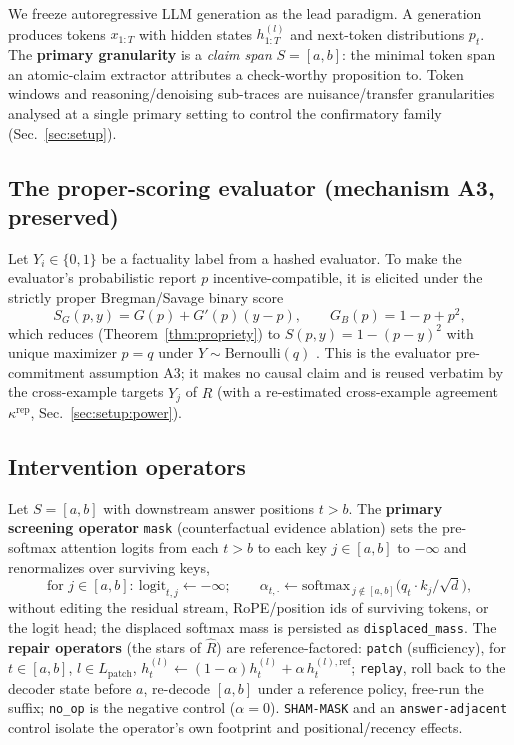 \documentclass[11pt]{article}
\theoremstyle{plain}
\theoremstyle{definition}
\newcommand{\Rhat}{\widehat{R}}
\begin{document}
We freeze autoregressive LLM generation as the lead paradigm. A generation produces
tokens $x_{1:T}$ with hidden states $h^{(l)}_{1:T}$ and next-token distributions
$p_t$. The \textbf{primary granularity} is a \emph{claim span} $S=[a,b]$: the
minimal token span an atomic-claim extractor attributes a check-worthy proposition
to. Token windows and reasoning/denoising sub-traces are nuisance/transfer
granularities analysed at a single primary setting to control the confirmatory
family (Sec.~\ref{sec:setup}).

\subsection{The proper-scoring evaluator (mechanism A3, preserved)}\label{sec:ciu:proper}

Let $Y_i\in\{0,1\}$ be a factuality label from a hashed evaluator. To make the
evaluator's probabilistic report $p$ incentive-compatible, it is elicited under the
strictly proper Bregman/Savage binary score
\begin{equation}
S_G(p,y) = G(p) + G'(p)(y-p),
\qquad G_B(p)=1-p+p^2,
\label{eq:savage}
\end{equation}
which reduces (Theorem~\ref{thm:propriety}) to $S(p,y)=1-(p-y)^2$ with unique
maximizer $p=q$ under $Y\sim\mathrm{Bernoulli}(q)$
\cite{savage1971elicitation,gneiting2007strictly,brier1950verification}. This is
the evaluator pre-commitment assumption A3; it makes no causal claim and is reused
verbatim by the cross-example targets $Y_j$ of $\Rhat$ (with a re-estimated
cross-example agreement $\kappa^{\mathrm{rep}}$, Sec.~\ref{sec:setup:power}).

\subsection{Intervention operators}\label{sec:ciu:ops}

Let $S=[a,b]$ with downstream answer positions $t>b$. The \textbf{primary screening
operator} \texttt{mask} (counterfactual evidence ablation) sets the pre-softmax
attention logits from each $t>b$ to each key $j\in[a,b]$ to $-\infty$ and
renormalizes over surviving keys,
\begin{equation}
\text{for } j\in[a,b]:\ \mathrm{logit}_{t,j}\leftarrow-\infty;
\qquad \alpha_{t,\cdot}\leftarrow\mathrm{softmax}_{\,j\notin[a,b]}\big(q_t\!\cdot\! k_j/\sqrt{d}\big),
\label{eq:mask}
\end{equation}
without editing the residual stream, RoPE/position ids of surviving tokens, or the
logit head; the displaced softmax mass is persisted as \texttt{displaced\_mass}.
The \textbf{repair operators} (the stars of $\Rhat$) are reference-factored:
\texttt{patch} (sufficiency), for $t\in[a,b]$, $l\in L_{\mathrm{patch}}$,
$h^{(l)}_t\leftarrow(1-\alpha)h^{(l)}_t+\alpha\,h^{(l),\mathrm{ref}}_t$;
\texttt{replay}, roll back to the decoder state before $a$, re-decode $[a,b]$ under
a reference policy, free-run the suffix; \texttt{no\_op} is the negative control
($\alpha=0$). \texttt{SHAM-MASK} and an \texttt{answer-adjacent} control isolate the
operator's own footprint and positional/recency effects.
\end{document}
